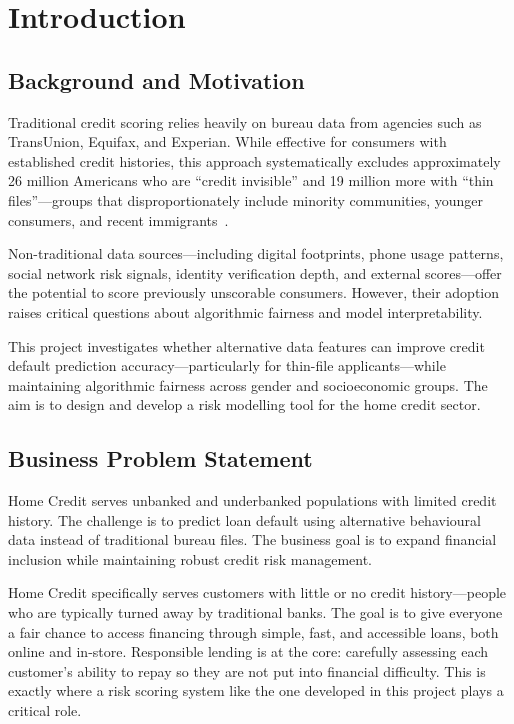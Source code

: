 \chapter{Introduction}
\label{chap:introduction}

\section{Background and Motivation}
\label{sec:background}

Traditional credit scoring relies heavily on bureau data from agencies such as TransUnion, Equifax, and Experian. While effective for consumers with established credit histories, this approach systematically excludes approximately 26 million Americans who are ``credit invisible'' and 19 million more with ``thin files''---groups that disproportionately include minority communities, younger consumers, and recent immigrants~\cite{cfpb2022}.

Non-traditional data sources---including digital footprints, phone usage patterns, social network risk signals, identity verification depth, and external scores---offer the potential to score previously unscorable consumers. However, their adoption raises critical questions about algorithmic fairness and model interpretability.

This project investigates whether alternative data features can improve credit default prediction accuracy---particularly for thin-file applicants---while maintaining algorithmic fairness across gender and socioeconomic groups. The aim is to design and develop a risk modelling tool for the home credit sector.

\section{Business Problem Statement}
\label{sec:business_problem}

Home Credit serves unbanked and underbanked populations with limited credit history. The challenge is to predict loan default using alternative behavioural data instead of traditional bureau files. The business goal is to expand financial inclusion while maintaining robust credit risk management.

Home Credit specifically serves customers with little or no credit history---people who are typically turned away by traditional banks. The goal is to give everyone a fair chance to access financing through simple, fast, and accessible loans, both online and in-store. Responsible lending is at the core: carefully assessing each customer's ability to repay so they are not put into financial difficulty. This is exactly where a risk scoring system like the one developed in this project plays a critical role.

